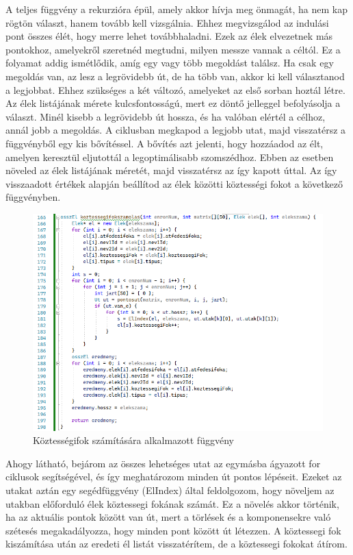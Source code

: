 A teljes függvény a rekurzióra épül, amely akkor hívja meg önmagát, ha nem kap rögtön választ, hanem tovább kell vizsgálnia. Ehhez megvizsgálod az indulási pont összes élét, hogy merre lehet továbbhaladni. Ezek az élek elvezetnek más pontokhoz, amelyekről szeretnéd megtudni, milyen messze vannak a céltól. Ez a folyamat addig ismétlődik, amíg egy vagy több megoldást találsz. Ha csak egy megoldás van, az lesz a legrövidebb út, de ha több van, akkor ki kell választanod a legjobbat. Ehhez szükséges a két változó, amelyeket az első sorban hoztál létre. Az élek listájának mérete kulcsfontosságú, mert ez döntő jelleggel befolyásolja a választ. Minél kisebb a legrövidebb út hossza, és ha valóban elértél a célhoz, annál jobb a megoldás. A ciklusban megkapod a legjobb utat, majd visszatérsz a függvényből egy kis bővítéssel. A bővítés azt jelenti, hogy hozzáadod az élt, amelyen keresztül eljutottál a legoptimálisabb szomszédhoz. Ebben az esetben növeled az élek listájának méretét, majd visszatérsz az így kapott úttal. Az így visszaadott értékek alapján beállítod az élek közötti köztességi fokot a következő függvényben.

\begin{figure}[h]
    \centering
    \includegraphics[scale=0.8]{images/koztessegifok}
    \caption{Köztességifok számítására alkalmazott függvény}
    \label{fig:enter-label}
\end{figure}

Ahogy látható, bejárom az összes lehetséges utat az egymásba ágyazott for ciklusok segítségével, és így meghatározom minden út pontos lépéseit. Ezeket az utakat aztán egy segédfüggvény (ElIndex) által feldolgozom, hogy növeljem az utakban előforduló élek köztessegi fokának számát. Ez a növelés akkor történik, ha az aktuális pontok között van út, mert a törlések és a komponensekre való szétesés megakadályozza, hogy minden pont között út létezzen. A köztessegi fok kiszámítása után az eredeti él listát visszatérítem, de a köztessegi fokokat átírom.

